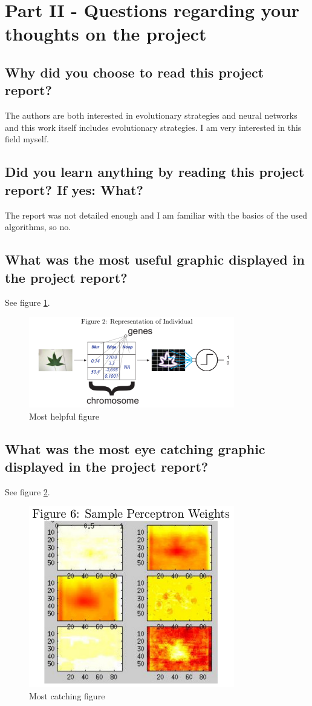 \documentclass[paper=a4, fontsize=11pt]{scrartcl} %
\numberwithin{equation}{section} %
\numberwithin{figure}{section} %
\numberwithin{table}{section} %
\begin{document}
\section{Part II - Questions regarding your thoughts on the project}
\subsection{Why did you choose to read this project report?}
The authors are both interested in evolutionary strategies and neural networks and this work itself includes evolutionary strategies. 
I am very interested in this field myself.
\subsection{Did you learn anything by reading this project report? If yes: What?}
The report was not detailed enough and I am familiar with the basics of the used algorithms, so no.
\subsection{What was the most useful graphic displayed in the project report?}
See figure \ref{fig:helpful}.

\begin{figure}[H]
\includegraphics[width=0.8\textwidth]{helpful.png}
\caption{Most helpful figure}
\label{fig:helpful}
\end{figure}
\subsection{What was the most eye catching graphic displayed in the project report?}
See figure \ref{fig:catching}.
\begin{figure}[H]
\includegraphics[width=0.8\textwidth]{catching.png}
\caption{Most catching figure}
\label{fig:catching}
\end{figure}
\end{document}
